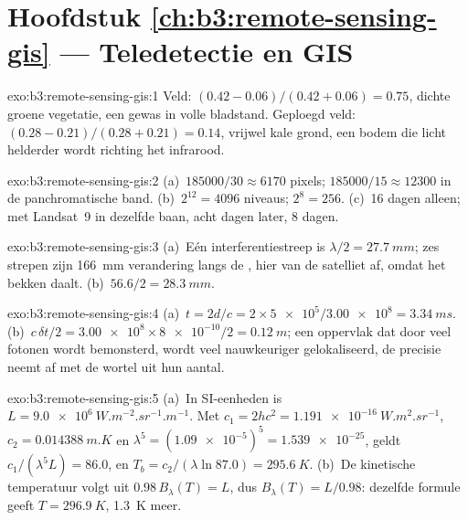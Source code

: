 \section*{Hoofdstuk \ref{ch:b3:remote-sensing-gis} --- Teledetectie en GIS}

\begin{solution}{exo:b3:remote-sensing-gis:1}
Veld: $(0.42 - 0.06)/(0.42 + 0.06) = 0.75$, dichte groene vegetatie, een gewas
in volle bladstand. Geploegd veld: $(0.28 - 0.21)/(0.28 + 0.21) = 0.14$, vrijwel
kale grond, een bodem die licht helderder wordt richting het infrarood.
\end{solution}

\begin{solution}{exo:b3:remote-sensing-gis:2}
(a)~$185000/30 \approx 6170$ pixels; $185000/15 \approx 12300$ in de
panchromatische band. (b)~$2^{12} = 4096$ niveaus; $2^8 = 256$. (c)~16 dagen
alleen; met Landsat~9 in dezelfde baan, acht dagen later, 8 dagen.
\end{solution}

\begin{solution}{exo:b3:remote-sensing-gis:3}
(a)~Eén interferentiestreep is $\lambda/2 = \qty{27.7}{mm}$; zes strepen zijn
\qty{166}{mm} verandering langs de , hier van de satelliet af, omdat
het bekken daalt. (b)~$56.6/2 = \qty{28.3}{mm}$.
\end{solution}

\begin{solution}{exo:b3:remote-sensing-gis:4}
(a)~$t = 2d/c = 2\times\num{5e5}/\num{3.00e8} = \qty{3.34}{ms}$.
(b)~$c\,\delta t/2 = \num{3.00e8}\times\num{8e-10}/2 = \qty{0.12}{m}$; een
oppervlak dat door veel fotonen wordt bemonsterd, wordt veel nauwkeuriger
gelokaliseerd, de precisie neemt af met de wortel uit hun aantal.
\end{solution}

\begin{solution}{exo:b3:remote-sensing-gis:5}
(a)~In SI-eenheden is $L = \qty{9.0e6}{W.m^{-2}.sr^{-1}.m^{-1}}$. Met $c_1 =
2hc^2 = \qty{1.191e-16}{W.m^2.sr^{-1}}$, $c_2 = \qty{0.014388}{m.K}$ en
$\lambda^5 = (\num{1.09e-5})^5 = \num{1.539e-25}$, geldt $c_1/(\lambda^5L) = 86.0$,
en $T_b = c_2/(\lambda\ln 87.0) = \qty{295.6}{K}$. (b)~De kinetische temperatuur
volgt uit $0.98\,B_\lambda(T) = L$, dus $B_\lambda(T) = L/0.98$: dezelfde
formule geeft $T = \qty{296.9}{K}$, \qty{1.3}{K} meer.
\end{solution}

